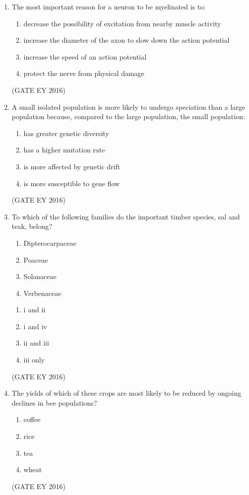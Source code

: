 \documentclass[journal]{IEEEtran}
\begin{document}
\begin{enumerate}
\item The most important reason for a neuron to be myelinated is to:
\begin{enumerate}
    \item decrease the possibility of excitation from nearby muscle activity
    \item increase the diameter of the axon to slow down the action potential
    \item increase the speed of an action potential
    \item protect the nerve from physical damage
\end{enumerate}
\hfill{(GATE EY 2016)}

\item A small isolated population is more likely to undergo speciation than a large population because, compared to the large population, the small population:
\begin{multicols}{2}
\begin{enumerate}
    \item has greater genetic diversity
    \item has a higher mutation rate
    \item is more affected by genetic drift
    \item is more susceptible to gene flow
\end{enumerate}
\end{multicols}
\hfill{(GATE EY 2016)}

\item To which of the following families do the important timber species, sal and teak, belong? 
    \begin{enumerate}[label=(\roman*)]
        \item Dipterocarpaceae
        \item Poaceae
        \item Solanaceae
        \item Verbenaceae
    \end{enumerate}
\begin{multicols}{4}
\begin{enumerate}
    \item i and ii
    \item i and iv
    \item ii and iii
    \item iii only
\end{enumerate}
\end{multicols}
\hfill{(GATE EY 2016)}

\item The yields of which of these crops are most likely to be reduced by ongoing declines in bee populations?
\begin{multicols}{4}
\begin{enumerate}
    \item coffee
    \item rice
    \item tea
    \item wheat
\end{enumerate}
\end{multicols}
\hfill{(GATE EY 2016)}


\end{enumerate}
\end{document}
